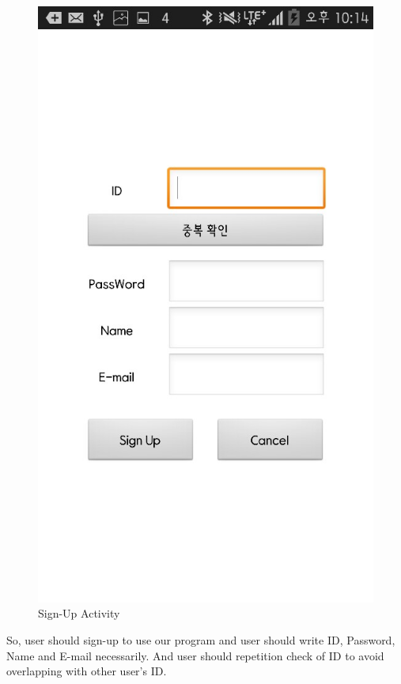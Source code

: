\documentclass[conference]{IEEEtran}
\begin{document}
\begin{figure}[H]
\begin{center}
    \includegraphics[scale=0.4]{signup}
    \caption{Sign-Up Activity} 
\end{center}
\end{figure}

So, user should sign-up to use our program and user should write ID, Password, Name and E-mail necessarily. And user should repetition check of ID to avoid overlapping with other user's ID.
\end{document}
